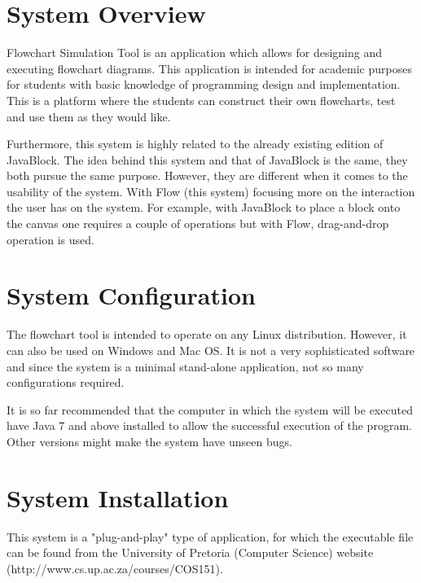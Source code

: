 \documentclass[11pt,a4paper,titlepage]{article}
\begin{document}

\newpage
\tableofcontents
{}
\newpage
{}
\section{System Overview}
	
		Flowchart Simulation Tool is an application which allows for designing and executing flowchart diagrams. This application is intended for academic purposes for students with basic knowledge of programming design and implementation. This is a platform where the students can construct their own flowcharts, test and use them as they would like. \newline
		
		Furthermore, this system is highly related to the already existing edition of JavaBlock. The idea behind this system and that of JavaBlock is the same, they both pursue the same purpose. However, they are different when it comes to the usability of the system. With Flow (this system) focusing more on the interaction the user has on the system. For example, with JavaBlock to place a block onto the canvas one requires a couple of operations but with Flow, drag-and-drop operation is used. 
		
\section{System Configuration}
		
		
		The flowchart tool is intended to operate on any Linux distribution. However, it can also be used on Windows and Mac OS. It is not a very sophisticated software and since the system is a minimal stand-alone application, not so many configurations required. 
		
		It is so far recommended that the computer in which the system will be executed have Java 7 and above installed to allow the successful execution of the program. Other versions might make the system have unseen bugs.
		
\section{System Installation}
		
		This system is a "plug-and-play" type of application, for which the executable file can be found from the University of Pretoria (Computer Science) website (http://www.cs.up.ac.za/courses/COS151). \newline
		
\end{document}
